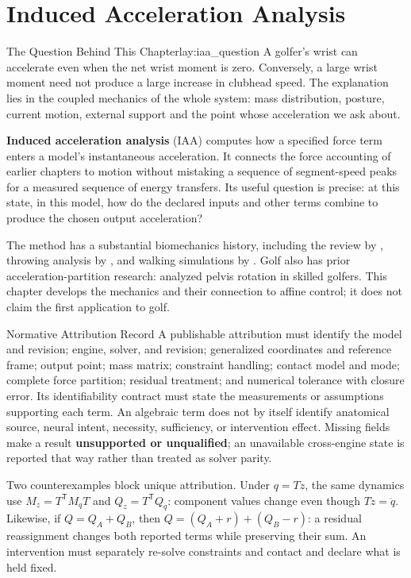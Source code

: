 \chapter{Induced Acceleration Analysis}
\label{ch:induced_acceleration}
\raggedbottom

\begin{laymansbox}{The Question Behind This Chapter}{lay:iaa_question}
A golfer's wrist can accelerate even when the net wrist moment is zero. Conversely, a large wrist moment need not produce a large increase in clubhead speed. The explanation lies in the coupled mechanics of the whole system: mass distribution, posture, current motion, external support and the point whose acceleration we ask about.

\textbf{Induced acceleration analysis} (IAA) computes how a specified force term enters a model's instantaneous acceleration. It connects the force accounting of earlier chapters to motion without mistaking a sequence of segment-speed peaks for a measured sequence of energy transfers. Its useful question is precise: at this state, in this model, how do the declared inputs and other terms combine to produce the chosen output acceleration?

The method has a substantial biomechanics history, including the review by \citep{zajac1989gordon}, throwing analysis by \citep{Hirashima2008kinetic}, and walking simulations by \citep{Neptune2001}. Golf also has prior acceleration-partition research: \citep{Takagi2021pelvis} analyzed pelvis rotation in skilled golfers. This chapter develops the mechanics and their connection to affine control; it does not claim the first application to golf.
\end{laymansbox}

\begin{infobox}{Normative Attribution Record}
A publishable attribution must identify the model and revision; engine, solver, and revision; generalized coordinates and reference frame; output point; mass matrix; constraint handling; contact model and mode; complete force partition; residual treatment; and numerical tolerance with closure error. Its identifiability contract must state the measurements or assumptions supporting each term. An algebraic term does not by itself identify anatomical source, neural intent, necessity, sufficiency, or intervention effect. Missing fields make a result \textbf{unsupported or unqualified}; an unavailable cross-engine state is reported that way rather than treated as solver parity.

Two counterexamples block unique attribution. Under $q=Tz$, the same dynamics use $M_z=T^\mathsf{T}M_qT$ and $Q_z=T^\mathsf{T}Q_q$: component values change even though $T\ddot z=\ddot q$. Likewise, if $Q=Q_A+Q_B$, then $Q=(Q_A+r)+(Q_B-r)$: a residual reassignment changes both reported terms while preserving their sum. An intervention must separately re-solve constraints and contact and declare what is held fixed.
\end{infobox}

